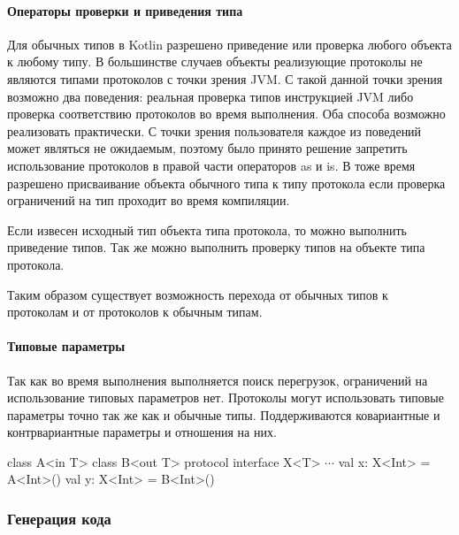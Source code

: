 \paragraph{Операторы проверки и приведения типа}
Для обычных типов в Kotlin разрешено приведение или проверка любого объекта к любому типу. В большинстве случаев объекты реализующие протоколы не являются типами протоколов с точки зрения JVM. С такой данной точки зрения возможно два поведения: реальная проверка типов инструкцией JVM либо проверка соответствию протоколов во время выполнения. Оба способа возможно реализовать практически. С точки зрения пользователя каждое из поведений может являться не ожидаемым, поэтому было принято решение запретить использование протоколов в правой части операторов as и is. В тоже время разрешено присваивание объекта обычного типа к типу протокола если проверка ограничений на тип проходит во время компиляции.

Если извесен исходный тип объекта типа протокола, то можно выполнить приведение типов. Так же можно выполнить проверку типов на объекте типа протокола.

Таким образом существует возможность перехода от обычных типов к протоколам и от протоколов к обычным типам.

\paragraph{Типовые параметры}
Так как во время выполнения выполняется поиск перегрузок, ограничений на использование типовых параметров нет. Протоколы могут использовать типовые параметры точно так же как и обычные типы. Поддерживаются ковариантные и контрвариантные параметры и отношения на них.

\begin{pyglist}[language=kotlin]
class A<in T>
class B<out T>
protocol interface X<T>
$\cdots$
val x: X<Int> = A<Int>()
val y: X<Int> = B<Int>()
\end{pyglist}

\subsubsection{Генерация кода}

